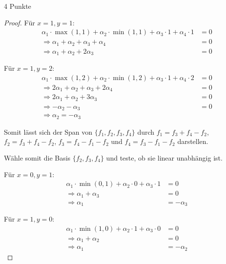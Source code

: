 \documentclass{problemset}
\begin{document}
\begin{problem}{4 Punkte}
\begin{proof}
    Für $x = 1, y = 1$:
    \begin{align*}
        \alpha_1 \cdot \max(1, 1) + \alpha_2 \cdot \min(1, 1) + \alpha_3 \cdot 1 + \alpha_4 \cdot 1 & = 0 \\
        \Rightarrow \alpha_1 + \alpha_2 + \alpha_3 + \alpha_4                                       & = 0 \\
        \Rightarrow \alpha_1 + \alpha_2 + 2 \alpha_3                                                & = 0
    \end{align*}

    Für $x = 1, y = 2$:
    \begin{align*}
        \alpha_1 \cdot \max(1, 2) + \alpha_2 \cdot \min(1, 2) + \alpha_3 \cdot 1 + \alpha_4 \cdot 2 & = 0 \\
        \Rightarrow 2\alpha_1 + \alpha_2 + \alpha_3 + 2\alpha_4                                     & = 0 \\
        \Rightarrow 2\alpha_1 + \alpha_2 + 3 \alpha_3                                               & = 0 \\
        \Rightarrow -\alpha_2 - \alpha_3                                                            & = 0 \\
        \Rightarrow \alpha_2 = - \alpha_3
    \end{align*}

    Somit lässt sich der Span von $\{f_1, f_2, f_3, f_4\}$ durch $f_1 = f_3 +
    f_4 - f_2$, $f_2 = f_3 + f_4 - f_2$, $f_3 = f_4 - f_1 - f_2$ und $f_4 = f_3
    - f_1 - f_2$ darstellen.

    Wähle somit die Basis $\{f_2, f_3, f_4\}$ und teste, ob sie linear
    unabhängig ist.

    Für $x = 0, y = 1$:
    \begin{align*}
        \alpha_1 \cdot \min(0, 1) + \alpha_2 \cdot 0 + \alpha_3 \cdot 1 & = 0         \\
        \Rightarrow \alpha_1 + \alpha_3                                 & = 0         \\
        \Rightarrow \alpha_1                                            & = -\alpha_3
    \end{align*}

    Für $x = 1, y = 0$:
    \begin{align*}
        \alpha_1 \cdot \min(1, 0) + \alpha_2 \cdot 1 + \alpha_3 \cdot 0 & = 0         \\
        \Rightarrow \alpha_1 + \alpha_2                                 & = 0         \\
        \Rightarrow \alpha_1                                            & = -\alpha_2
    \end{align*}


\end{proof}
\end{problem}
\end{document}
